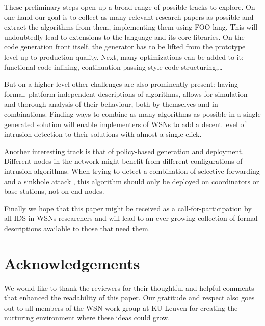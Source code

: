 \documentclass[conference]{IEEEtran}
\begin{document}
These preliminary steps open up a broad range of possible tracks to explore. On
one hand our goal is to collect as many relevant research papers as possible
and extract the algorithms from them, implementing them using FOO-lang. This
will undoubtedly lead to extensions to the language and its core libraries. On
the code generation front itself, the generator has to be lifted from the
prototype level up to production quality. Next, many optimizations can be added
to it: functional code inlining, continuation-passing style code
structuring,\dots

But on a higher level other challenges are also prominently present: having
formal, platform-independent descriptions of algorithms, allows for simulation
and thorough analysis of their behaviour, both by themselves and in
combinations. Finding ways to combine as many algorithms as possible in a
single generated solution will enable implementers of WSNs to add a decent
level of intrusion detection to their solutions with almost a single click.

Another interesting track is that of policy-based generation and deployment.
Different nodes in the network might benefit from different configurations of
intrusion algorithms. When trying to detect a combination of selective
forwarding and a sinkhole attack \cite{ngai2006intruder}, this algorithm should
only be deployed on coordinators or base stations, not on end-nodes.

Finally we hope that this paper might be received as a call-for-participation
by all IDS in WSNs researchers and will lead to an ever growing collection of
formal descriptions available to those that need them.

\section*{Acknowledgements}
\label{section:acknowledgements}

We would like to thank the reviewers for their thoughtful and helpful comments
that enhanced the readability of this paper. Our gratitude and respect also
goes out to all members of the WSN work group at KU Leuven for creating the
nurturing environment where these ideas could grow.



\end{document}
